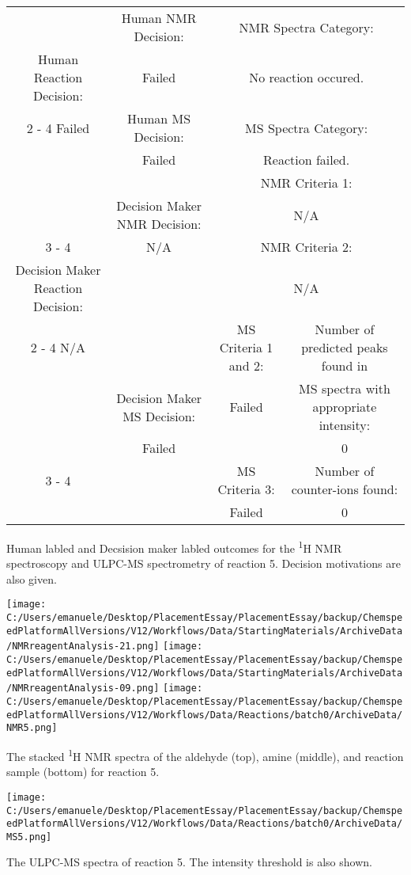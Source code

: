 \documentclass{article}%
\begin{document}
\begin{Decision Table}[H]%
\begin{tabular}{|c|c|c|c|}%
\hline%
&Human NMR Decision:&\multicolumn{2}{|c|}{NMR Spectra Category:}\\%
Human Reaction Decision:&Failed&\multicolumn{2}{|c|}{No reaction occured.}\\%
\cline{2%
-%
4}%
Failed&Human MS Decision:&\multicolumn{2}{|c|}{MS Spectra Category:}\\%
&Failed&\multicolumn{2}{|c|}{Reaction failed.}\\%
\hline%
&&\multicolumn{2}{|c|}{NMR Criteria 1:}\\%
&Decision Maker NMR Decision:&\multicolumn{2}{|c|}{N/A}\\%
\cline{3%
-%
4}%
&N/A&\multicolumn{2}{|c|}{NMR Criteria 2:}\\%
Decision Maker Reaction Decision:&&\multicolumn{2}{|c|}{N/A}\\%
\cline{2%
-%
4}%
N/A&&MS Criteria 1 and 2:&Number of predicted peaks found in\\%
&Decision Maker MS Decision:&Failed&MS spectra with appropriate intensity:\\%
&Failed&&0\\%
\cline{3%
-%
4}%
&&MS Criteria 3:&Number of counter{-}ions found:\\%
&&Failed&0\\%
\hline%
\end{tabular}%
\caption{Human labled and Decsision maker labled outcomes for the \textsuperscript{1}H NMR spectroscopy and ULPC-MS spectrometry of reaction 5. Decision motivations are also given.}%
\end{Decision Table}%
\begin{NMR Spectra}[H]%
\begin{center}%
\texttt{[image: C:/Users/emanuele/Desktop/PlacementEssay/PlacementEssay/backup/ChemspeedPlatformAllVersions/V12/Workflows/Data/StartingMaterials/ArchiveData/NMRreagentAnalysis-21.png]}\hfill%
\texttt{[image: C:/Users/emanuele/Desktop/PlacementEssay/PlacementEssay/backup/ChemspeedPlatformAllVersions/V12/Workflows/Data/StartingMaterials/ArchiveData/NMRreagentAnalysis-09.png]}\hfill%
\texttt{[image: C:/Users/emanuele/Desktop/PlacementEssay/PlacementEssay/backup/ChemspeedPlatformAllVersions/V12/Workflows/Data/Reactions/batch0/ArchiveData/NMR5.png]}\hfill%
\end{center}%
\caption{The stacked \textsuperscript{1}H NMR spectra of the aldehyde (top), amine (middle), and reaction sample (bottom) for reaction 5.}%
\end{NMR Spectra}%
\begin{MS Spectra}[H]%
\begin{center}%
\texttt{[image: C:/Users/emanuele/Desktop/PlacementEssay/PlacementEssay/backup/ChemspeedPlatformAllVersions/V12/Workflows/Data/Reactions/batch0/ArchiveData/MS5.png]}\hfill%
\end{center}%
\caption{The ULPC-MS spectra of reaction 5. The intensity threshold is also shown.}%
\end{MS Spectra}%
\end{document}
